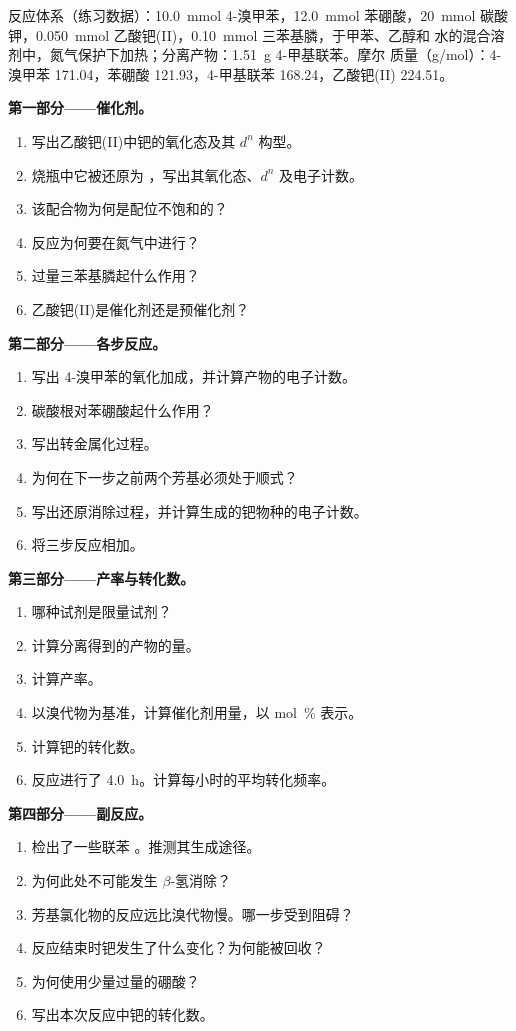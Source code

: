 \begin{problem}
\label{pb:b2:catalytic-cycles:1}
反应体系（练习数据）：\qty{10.0}{mmol} 4-溴甲苯，\qty{12.0}{mmol}
苯硼酸，\qty{20}{mmol} 碳酸钾，\qty{0.050}{mmol}
乙酸钯(II)，\qty{0.10}{mmol} 三苯基膦，于甲苯、乙醇和
水的混合溶剂中，氮气保护下加热；分离产物：\qty{1.51}{g} 4-甲基联苯。摩尔
质量（\unit{g/mol}）：4-溴甲苯 171.04，苯硼酸 121.93，4-甲基联苯
168.24，乙酸钯(II) 224.51。

\medskip
\noindent\textbf{第一部分——催化剂。}
\begin{enumerate}
  \item 写出乙酸钯(II)中钯的氧化态及其 $d^n$ 构型。
  \item 烧瓶中它被还原为 ，写出其氧化态、$d^n$
        及电子计数。
  \item 该配合物为何是配位不饱和的？
  \item 反应为何要在氮气中进行？
  \item 过量三苯基膦起什么作用？
  \item 乙酸钯(II)是催化剂还是预催化剂？
\end{enumerate}

\medskip
\noindent\textbf{第二部分——各步反应。}
\begin{enumerate}[resume]
  \item 写出 4-溴甲苯的氧化加成，并计算产物的电子计数。
  \item 碳酸根对苯硼酸起什么作用？
  \item 写出转金属化过程。
  \item 为何在下一步之前两个芳基必须处于顺式？
  \item 写出还原消除过程，并计算生成的钯物种的电子计数。
  \item 将三步反应相加。
\end{enumerate}

\medskip
\noindent\textbf{第三部分——产率与转化数。}
\begin{enumerate}[resume]
  \item 哪种试剂是限量试剂？
  \item 计算分离得到的产物的量。
  \item 计算产率。
  \item 以溴代物为基准，计算催化剂用量，以 mol~\% 表示。
  \item 计算钯的转化数。
  \item 反应进行了 \qty{4.0}{h}。计算每小时的平均转化频率。
\end{enumerate}

\medskip
\noindent\textbf{第四部分——副反应。}
\begin{enumerate}[resume]
  \item 检出了一些联苯 。推测其生成途径。
  \item 为何此处不可能发生 $\beta$-氢消除？
  \item 芳基氯化物的反应远比溴代物慢。哪一步受到阻碍？
  \item 反应结束时钯发生了什么变化？为何能被回收？
  \item 为何使用少量过量的硼酸？
  \item 写出本次反应中钯的转化数。
\end{enumerate}
\end{problem}
